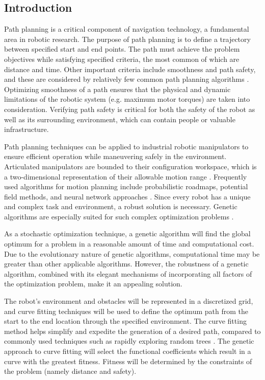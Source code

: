 \documentclass[twoside]{article}
\begin{document}
\begin{multicols}{2} %

\section{Introduction}

Path planning is a critical component of navigation technology, a fundamental area in robotic research. The purpose of path planning is to define a trajectory between specified start and end points. The path must achieve the problem objectives while satisfying specified criteria, the most common of which are distance and time. Other important criteria include smoothness and path safety, and these are considered by relatively few common path planning algorithms \cite{elshamli04}. Optimizing smoothness of a path ensures that the physical and dynamic limitations of the robotic system (e.g. maximum motor torques) are taken into consideration. Verifying path safety is critical for both the safety of the robot as well as its surrounding environment, which can contain people or valuable infrastructure.

Path planning techniques can be applied to industrial robotic manipulators to ensure efficient operation while maneuvering safely in the environment. Articulated manipulators are bounded to their configuration workspace, which is a two-dimensional representation of their allowable motion range \cite{kavraki96}. Frequently used algorithms for motion planning include probabilistic roadmaps, potential field methods, and neural network approaches \cite{sharir89,khosla88,rimon92,yang00}. Since every robot has a unique and complex task and environment, a robust solution is necessary. Genetic algorithms are especially suited for such complex optimization problems \cite{renner03}.

As a stochastic optimization technique, a genetic algorithm will find the global optimum for a problem in a reasonable amount of time and computational cost. Due to the evolutionary nature of genetic algorithms, computational time may be greater than other applicable algorithms. However, the robustness of a genetic algorithm, combined with its elegant mechanisms of incorporating all factors of the optimization problem, make it an appealing solution.

The robot’s environment and obstacles will be represented in a discretized grid, and curve fitting techniques will be used to define the optimum path from the start to the end location through the specified environment. The curve fitting method helps simplify and expedite the generation of a desired path, compared to commonly used techniques such as rapidly exploring random trees \cite{rodriguez06}. The genetic approach to curve fitting will select the functional coefficients which result in a curve with the greatest fitness. Fitness will be determined by the constraints of the problem (namely distance and safety).


\end{multicols}
\end{document}
